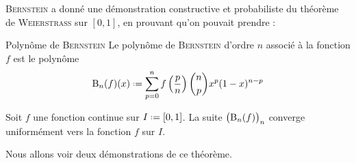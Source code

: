 \textsc{Bernstein} a donné une démonstration constructive et probabiliste du théorème de \textsc{Weierstrass} sur $[0, 1]$, en prouvant qu'on pouvait prendre : 

\begin{defi}{Polynôme de \textsc{Bernstein}}
    Le polynôme de \textsc{Bernstein} d'ordre $n$ associé à la fonction $f$ est le polynôme
    \begin{equation} \label{1}
        \Bernstein_n(f)(x) \defeq \sum_{p=0}^{n} f \left( \frac{p}{n} \right) \binom{n}{p} x^p (1-x)^{n-p}
    \end{equation}
\end{defi}

\begin{theo}{}
    Soit $f$ une fonction continue sur $I \defeq [0, 1]$. 
    La suite $\big( \mathrm{B}_n(f) \big)_n$ converge uniformément vers la fonction $f$ sur $I$.
\end{theo}

Nous allons voir deux démonstrations de ce théorème.

